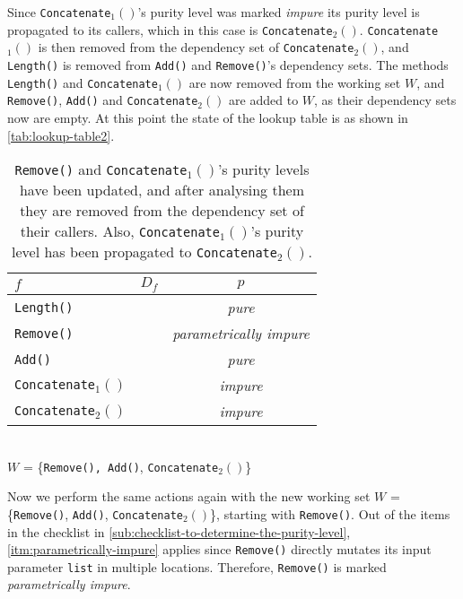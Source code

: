\documentclass[a4paper,12pt]{article}
\begin{document}
Since \texttt{Concatenate$_1()$}'s purity level was marked \textit{impure} its purity level is propagated to its callers, which in this case is \texttt{Concatenate$_2()$}. \texttt{Concatenate$_1()$} is then removed from the dependency set of \texttt{Concatenate$_2()$}, and \texttt{Length()} is removed from \texttt{Add()} and \texttt{Remove()}'s dependency sets. The methods \texttt{Length()} and \texttt{Concatenate$_1()$} are now removed from the working set $W$, and \texttt{Remove()}, \texttt{Add()} and \texttt{Concatenate$_2()$} are added to $W$, as their dependency sets now are empty. At this point the state of the lookup table is as shown in \autoref{tab:lookup-table2}.

\begin{table}[H]
  \caption{\texttt{Remove()} and \texttt{Concatenate$_1()$}'s purity levels have been updated, and after analysing them they are removed from the dependency set of their callers. Also, \texttt{Concatenate$_1()$}'s purity level has been propagated to \texttt{Concatenate$_2()$}.}
  \label{tab:lookup-table2}
  \centering
  \begin{tabular}{|l|c|c|}
    \hline
    $f$                        & $D_f$                  & $p$                            \\ \hline
    \texttt{Length()}          &                        & \textit{pure}                         \\
    \texttt{Remove()}          &                        & \textit{parametrically impure}        \\
    \texttt{Add()}             &                        & \textit{pure}                         \\
    \texttt{Concatenate$_1()$}  &                        & \textit{impure}                       \\
    \texttt{Concatenate$_2()$}  &                        & \textit{impure}                       \\ \hline
  \end{tabular}
  \\
  $W$ = \{\texttt{\texttt{Remove()}, Add()}, \texttt{Concatenate$_2()$}\}
\end{table}

Now we perform the same actions again with the new working set $W$ = \{\texttt{Remove()}, \texttt{Add()}, \texttt{Concatenate$_2()$}\}, starting with \texttt{Remove()}. Out of the items in the checklist in \autoref{sub:checklist-to-determine-the-purity-level}, \autoref{itm:parametrically-impure} applies since \texttt{Remove()} directly mutates its input parameter \texttt{list} in multiple locations. Therefore, \texttt{Remove()} is marked \textit{parametrically impure}.
\end{document}

